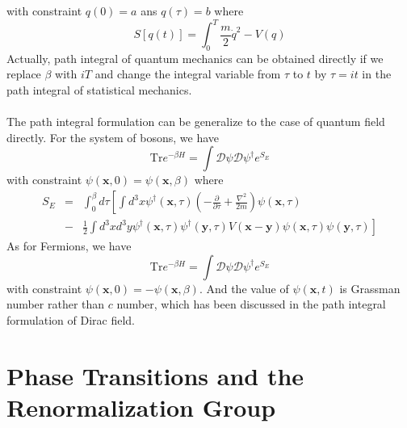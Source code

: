 \documentclass[cyan]{elegantnote}
\begin{document}
with constraint $q(0) = a$ ans $q(\tau) = b$
where
\[S[q(t)] = \int_0^{T} \frac{m}{2}\dot{q}^2 - V(q)\]
Actually, path integral of quantum mechanics can be obtained directly if we replace $\beta$ with $iT$ and change the integral variable from $\tau$ to $t$ by $\tau = it$ in the path integral  of statistical mechanics.
\\ \\
The path integral formulation can be generalize to the case of quantum field directly. For the system of bosons, we have
\[\mathrm{Tr}e^{-\beta H} = \int \mathcal{D}\psi \mathcal{D}\psi^{\dagger} e^{S_E}\]
with constraint $\psi(\bm{x},0) = \psi(\bm{x},\beta)$
where
\begin{eqnarray}
S_E &=& \int_0^{\beta}d\tau \left[ \int d^3x \psi^{\dagger}(\bm{x},\tau) \left( -\frac{\partial}{\partial \tau} + \frac{\nabla^2}{2m} \right) \psi(\bm{x},\tau) \right. \nonumber \\
&-& \left. \frac{1}{2}\int d^3x d^3y\psi^{\dagger}(\bm{x},\tau)\psi^{\dagger}(\bm{y},\tau)V(\bm{x}-\bm{y})\psi(\bm{x},\tau)\psi(\bm{y},\tau) \right] \nonumber
\end{eqnarray}
As for Fermions, we have
\[\mathrm{Tr}e^{-\beta H} = \int \mathcal{D}\psi \mathcal{D}\psi^{\dagger} e^{S_E}\]
with constraint $\psi(\bm{x},0) = -\psi(\bm{x},\beta)$. 
And the value of $\psi(\bm{x},t)$ is Grassman number rather than $c$ number, which has been discussed in the path integral formulation of Dirac field.

\chapter{Phase Transitions and the Renormalization Group}
\end{document}

